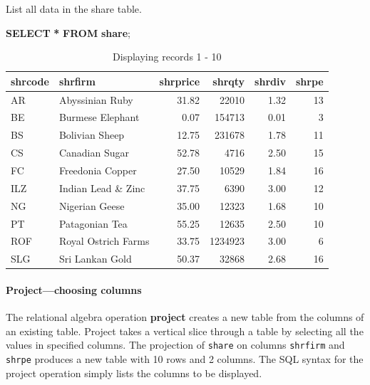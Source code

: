 \documentclass[
]{article}
\newenvironment{Shaded}{\begin{snugshade}}{\end{snugshade}}
\newcommand{\KeywordTok}[1]{\textcolor[rgb]{0.13,0.29,0.53}{\textbf{#1}}}
\newcommand{\NormalTok}[1]{#1}
\newcommand{\OperatorTok}[1]{\textcolor[rgb]{0.81,0.36,0.00}{\textbf{#1}}}
\begin{document}
List all data in the share table.

\begin{Shaded}
\begin{Highlighting}[]
\KeywordTok{SELECT} \OperatorTok{*} \KeywordTok{FROM} \KeywordTok{share}\NormalTok{;}
\end{Highlighting}
\end{Shaded}

\begin{table}

\caption{\label{tab:unnamed-chunk-6}Displaying records 1 - 10}
\centering
\begin{tabular}[t]{l|l|r|r|r|r}
\hline
shrcode & shrfirm & shrprice & shrqty & shrdiv & shrpe\\
\hline
AR & Abyssinian Ruby & 31.82 & 22010 & 1.32 & 13\\
\hline
BE & Burmese Elephant & 0.07 & 154713 & 0.01 & 3\\
\hline
BS & Bolivian Sheep & 12.75 & 231678 & 1.78 & 11\\
\hline
CS & Canadian Sugar & 52.78 & 4716 & 2.50 & 15\\
\hline
FC & Freedonia Copper & 27.50 & 10529 & 1.84 & 16\\
\hline
ILZ & Indian Lead \& Zinc & 37.75 & 6390 & 3.00 & 12\\
\hline
NG & Nigerian Geese & 35.00 & 12323 & 1.68 & 10\\
\hline
PT & Patagonian Tea & 55.25 & 12635 & 2.50 & 10\\
\hline
ROF & Royal Ostrich Farms & 33.75 & 1234923 & 3.00 & 6\\
\hline
SLG & Sri Lankan Gold & 50.37 & 32868 & 2.68 & 16\\
\hline
\end{tabular}
\end{table}

\hypertarget{projectchoosing-columns}{%
\paragraph*{Project---choosing columns}\label{projectchoosing-columns}}

The relational algebra operation \textbf{project} creates a new table from the columns of an existing table. Project takes a vertical slice through a table by selecting all the values in specified columns. The projection of \texttt{share} on columns \texttt{shrfirm} and \texttt{shrpe} produces a new table with 10 rows and 2 columns. The SQL syntax for the project operation simply lists the columns to be displayed.
\end{document}
